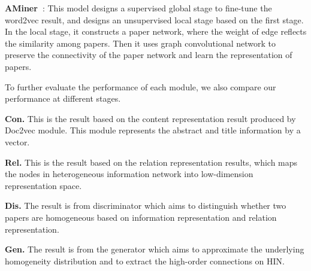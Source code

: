 \documentclass[letterpaper]{article} %
\begin{document}
\textbf{AMiner~\cite{JieTang}}: This model designs a supervised global stage to fine-tune the word2vec result, and designs an unsupervised local stage based on the first stage. In the local stage, it constructs a paper network, where the weight of edge reflects the similarity among papers. Then it uses graph convolutional network to preserve the connectivity of the paper network and learn the representation of papers. 


To further evaluate the performance of each module, we also compare our performance at different stages. 

\textbf{Con.} This is the result based on the content representation result produced by Doc2vec module. This module represents the abstract and title information by a vector.

\textbf{Rel.} This is the result based on the relation representation results, which maps the nodes in heterogeneous information network into low-dimension representation space.

\textbf{Dis.} The result is from discriminator which aims to distinguish whether two papers are homogeneous based on information representation and relation representation. 

\textbf{Gen.} The result is from the generator which aims to approximate the underlying homogeneity distribution and to extract the high-order connections on HIN.

\end{document}
